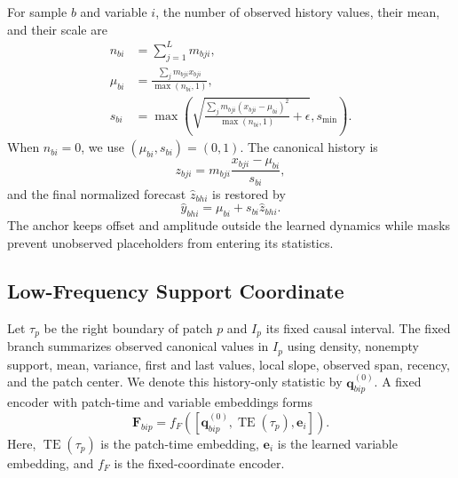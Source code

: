 For sample $b$ and variable $i$, the number of observed history values, their
mean, and their scale are
\begin{align}
n_{bi} &= \sum_{j=1}^{L}m_{bji}, \label{eq:count}\\
\mu_{bi} &= \frac{\sum_jm_{bji}x_{bji}}{\max(n_{bi},1)}, \label{eq:mean}\\
s_{bi} &= \max\!\left(
\sqrt{\frac{\sum_jm_{bji}(x_{bji}-\mu_{bi})^2}{\max(n_{bi},1)}+\epsilon},
s_{\min}\right). \label{eq:scale}
\end{align}
When $n_{bi}=0$, we use $(\mu_{bi},s_{bi})=(0,1)$. The canonical history is
\begin{equation}
z_{bji}=m_{bji}\frac{x_{bji}-\mu_{bi}}{s_{bi}},
\label{eq:canonical}
\end{equation}
and the final normalized forecast $\widehat z_{bhi}$ is restored by
\begin{equation}
\widehat y_{bhi}=\mu_{bi}+s_{bi}\widehat z_{bhi}.
\label{eq:restore}
\end{equation}
The anchor keeps offset and amplitude outside the learned dynamics while masks
prevent unobserved placeholders from entering its statistics.

\subsection{Low-Frequency Support Coordinate}

Let $\tau_p$ be the right boundary of patch $p$ and $I_p$ its fixed causal
interval. The fixed branch summarizes observed canonical values in $I_p$ using
density, nonempty support, mean, variance, first and last values, local slope,
observed span, recency, and the patch center. We denote this history-only
statistic by $\mathbf q^{(0)}_{bip}$. A fixed encoder with patch-time and
variable embeddings forms
\begin{equation}
\mathbf F_{bip}=f_F\!\left(
[\mathbf q^{(0)}_{bip},\operatorname{TE}(\tau_p),\mathbf e_i]\right).
\label{eq:fixed-token}
\end{equation}
Here, $\operatorname{TE}(\tau_p)$ is the patch-time embedding, $\mathbf e_i$
is the learned variable embedding, and $f_F$ is the fixed-coordinate encoder.

